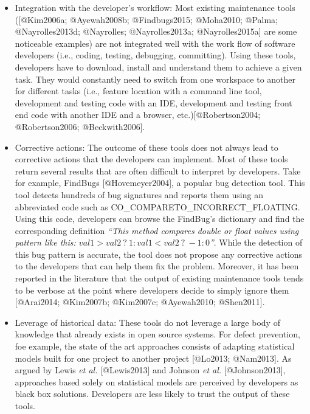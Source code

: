 \begin{itemize}
\item
  Integration with the developer's workflow: Most existing maintenance
  tools ({[}@Kim2006a; @Ayewah2008b; @Findbugs2015; @Moha2010; @Palma;
  @Nayrolles2013d; @Nayrolles; @Nayrolles2013a; @Nayrolles2015a{]} are
  some noticeable examples) are not integrated well with the work flow
  of software developers (i.e., coding, testing, debugging, committing).
  Using these tools, developers have to download, install and understand
  them to achieve a given task. They would constantly need to switch
  from one workspace to another for different tasks (i.e., feature
  location with a command line tool, development and testing code with
  an IDE, development and testing front end code with another IDE and a
  browser, etc.){[}@Robertson2004; @Robertson2006; @Beckwith2006{]}.
\item
  Corrective actions: The outcome of these tools does not always lead to
  corrective actions that the developers can implement. Most of these
  tools return several results that are often difficult to interpret by
  developers. Take for example, FindBugs {[}@Hovemeyer2004{]}, a popular
  bug detection tool. This tool detects hundreds of bug signatures and
  reports them using an abbreviated code such as
  {CO\_COMPARETO\_INCORRECT\_FLOATING}. Using this code, developers can
  browse the FindBug's dictionary and find the corresponding definition
  {\emph{``This method compares double or float values using pattern
  like this: \(val1 > val2~?~1 : val1 < val2~?~-1 : 0\)''}}. While the
  detection of this bug pattern is accurate, the tool does not propose
  any corrective actions to the developers that can help them fix the
  problem. Moreover, it has been reported in the literature that the
  output of existing maintenance tools tends to be verbose at the point
  where developers decide to simply ignore them {[}@Arai2014; @Kim2007b;
  @Kim2007c; @Ayewah2010; @Shen2011{]}.
\item
  Leverage of historical data: These tools do not leverage a large body
  of knowledge that already exists in open source systems. For defect
  prevention, foe example, the state of the art approaches consists of
  adapting statistical models built for one project to another project
  {[}@Lo2013; @Nam2013{]}. As argued by Lewis {\emph{et al.}}
  {[}@Lewis2013{]} and Johnson {\emph{et al.}} {[}@Johnson2013{]},
  approaches based solely on statistical models are perceived by
  developers as black box solutions. Developers are less likely to trust
  the output of these tools.
\end{itemize}

